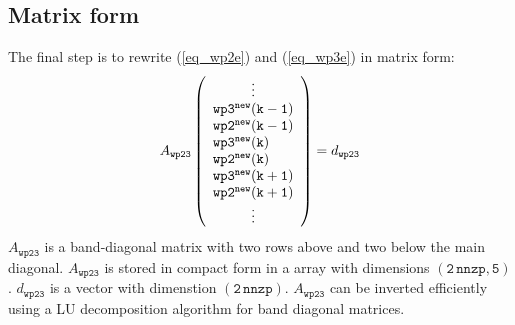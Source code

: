 \documentclass[11pt,fleqn]{article}
\begin{document}
\subsection{Matrix form}

The final step is to rewrite (\ref{eq_wp2e}) and (\ref{eq_wp3e}) in matrix
form:
%
\begin{equation}
A_{\mathtt{wp23}}
\left( \begin{array}{l}
  \hfill \vdots \hfill \\
  \mathtt{ wp3^{new}(k-1) } \\
  \mathtt{ wp2^{new}(k-1) } \\
  \mathtt{ wp3^{new}(k)   } \\
  \mathtt{ wp2^{new}(k)   } \\
  \mathtt{ wp3^{new}(k+1) } \\
  \mathtt{ wp2^{new}(k+1) } \\
  \hfill \vdots \hfill
\end{array} \right)
= d_{\mathtt{wp23}}
\end{equation}
%
$A_{\mathtt{wp23}}$ is a band-diagonal matrix with two rows above and two below 
the main diagonal. $A_{\mathtt{wp23}}$ is stored in compact form in a array 
with dimensions $\mathtt{(2\,nnzp, 5)}$. $d_{\mathtt{wp23}}$ is a vector 
with dimenstion $\mathtt{(2\,nnzp)}$. $A_{\mathtt{wp23}}$ can be inverted 
efficiently using a LU decomposition algorithm for band diagonal matrices.
\end{document}
